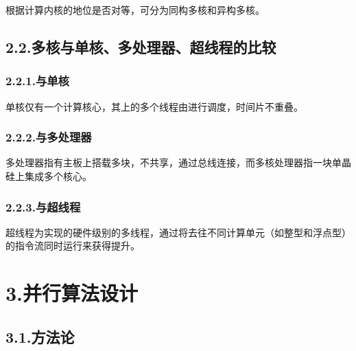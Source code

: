 \documentclass{article}
\begin{document}
\noindent{}根据计算内核的地位是否对等，可分为同构多核和异构多核。%

\subsection{2.2.\hspace*{0.5em}多核与单核、多处理器、超线程的比较}\label{section}%

\subsubsection{2.2.1.\hspace*{0.5em}与单核}\label{section}%

\noindent{}单核仅有一个计算核心，其上的多个线程由进行调度，时间片不重叠。%

\subsubsection{2.2.2.\hspace*{0.5em}与多处理器}\label{section}%

\noindent{}多处理器指有主板上搭载多块，不共享，通过总线连接，而多核处理器指一块单晶硅上集成多个核心。%

\subsubsection{2.2.3.\hspace*{0.5em}与超线程}\label{section}%

\noindent{}超线程为实现的硬件级别的多线程，通过将去往不同计算单元（如整型和浮点型）的指令流同时运行来获得提升。%

\section{3.\hspace*{0.5em}并行算法设计}\label{section}%

\subsection{3.1.\hspace*{0.5em}方法论}\label{section}%
\end{document}
